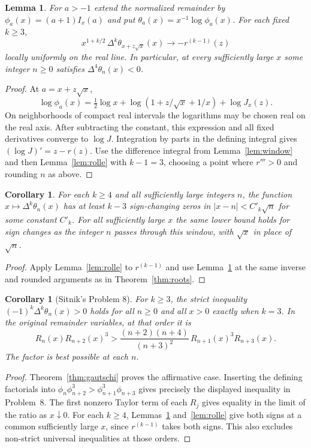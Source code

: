\documentclass[11pt,a4paper]{article}
\newtheorem{lemma}[theorem]{Lemma}
\newtheorem{corollary}[theorem]{Corollary}
\begin{document}
\begin{lemma}\label{lem:logwindow}
For $a>-1$ extend the normalized remainder by $\phi_a(x)=(a+1)I_x(a)$ and put $\theta_a(x)=x^{-1}\log\phi_a(x)$. For each fixed $k\ge3$,
\[
 x^{1+k/2}\,\Delta^k\theta_{x+z\sqrt x}(x)\longrightarrow
             -r^{(k-1)}(z)
\]
locally uniformly on the real line. In particular, at every sufficiently large $x$ some integer $n\ge0$ satisfies $\Delta^4\theta_n(x)<0$.
\end{lemma}
\begin{proof}
At $a=x+z\sqrt x$,
\[
 \log\phi_a(x)=\tfrac12\log x+
 \log(1+z/\sqrt x+1/x)+\log J_x(z).
\]
On neighborhoods of compact real intervals the logarithms may be chosen real on the real axis. After subtracting the constant, this expression and all fixed derivatives converge to $\log J$. Integration by parts in the defining integral gives $(\log J)'=z-r(z)$. Use the difference integral from Lemma~\ref{lem:window} and then Lemma~\ref{lem:rolle} with $k-1=3$, choosing a point where $r'''>0$ and rounding $n$ as above.
\end{proof}

\begin{corollary}
For each $k\ge4$ and all sufficiently large integers $n$, the function $x\mapsto\Delta^k\theta_n(x)$ has at least $k-3$ sign-changing zeros in $|x-n|<C'_k\sqrt n$ for some constant $C'_k$. For all sufficiently large $x$ the same lower bound holds for sign changes as the integer $n$ passes through this window, with $\sqrt{x}$ in place of $\sqrt{n}$.
\end{corollary}
\begin{proof}
Apply Lemma~\ref{lem:rolle} to $r^{(k-1)}$ and use Lemma~\ref{lem:logwindow} at the same inverse and rounded arguments as in Theorem~\ref{thm:roots}.
\end{proof}

\begin{corollary}[Sitnik's Problem 8]\label{cor:order8}
For $k\ge3$, the strict inequality $(-1)^k\Delta^k\theta_n(x)>0$ holds for all $n\ge0$ and all $x>0$ exactly when $k=3$. In the original remainder variables, at that order it is
\[
 R_n(x)R_{n+2}(x)^3>
 \frac{(n+2)(n+4)}{(n+3)^2}\,R_{n+1}(x)^3R_{n+3}(x).
\]
The factor is best possible at each $n$.
\end{corollary}
\begin{proof}
Theorem~\ref{thm:gautschi} proves the affirmative case. Inserting the defining factorials into $\phi_n\phi_{n+2}^3>\phi_{n+1}^3\phi_{n+3}$ gives precisely the displayed inequality in Problem~8. The first nonzero Taylor term of each $R_j$ gives equality in the limit of the ratio as $x\downarrow0$. For each $k\ge4$, Lemmas~\ref{lem:logwindow} and~\ref{lem:rolle} give both signs at a common sufficiently large $x$, since $r^{(k-1)}$ takes both signs. This also excludes non-strict universal inequalities at those orders.
\end{proof}
\end{document}
